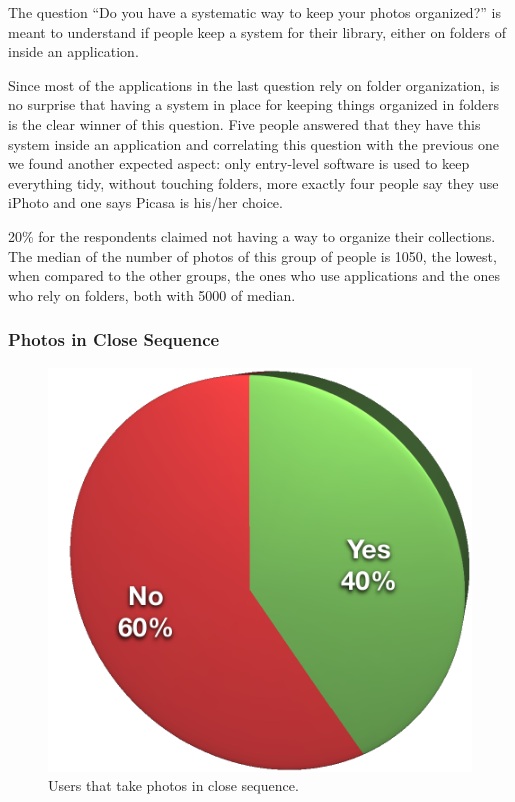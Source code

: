 The question ``Do you have a systematic way to keep your photos organized?'' is meant to understand if people keep a system for their library, either on folders of inside an application.

Since most of the applications in the last question rely on folder organization, is no surprise that having a system in place for keeping things organized in folders is the clear winner of this question. Five people answered that they have this system inside an application and correlating this question with the previous one we found another expected aspect: only entry-level software is used to keep everything tidy, without touching folders, more exactly four people say they use iPhoto and one says Picasa is his/her choice.

20\% for the respondents claimed not having a way to organize their collections. The median of the number of photos of this group of people is 1050, the lowest, when compared to the other groups, the ones who use applications and the ones who rely on folders, both with 5000 of median.




\subsubsection{Photos in Close Sequence} %
\label{ssub:photos_in_close_sequence}

\begin{figure}
	\vspace{-50pt}
	\begin{center}
		\includegraphics[width=\linewidth]{Figures/survey/close-seq}
	\end{center}
	\vspace{-20pt}
	\caption{Users that take photos in close sequence.}
	\vspace{-5pt}
	\label{fig:us:org}
\end{figure}


